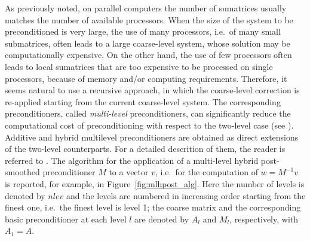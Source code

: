 As previously noted, on parallel computers the number of sumatrices usually matches
the number of available processors. When the size of the system to be preconditioned
is very large, the use of many processors, i.e.\ of many small submatrices, often
leads to a large coarse-level system, whose solution may be computationally expensive.
On the other hand, the use of few processors often leads to local sumatrices that
are too expensive to be processed on single processors, because of memory and/or
computing requirements. Therefore, it seems natural to use a recursive approach,
in which the coarse-level correction is re-applied starting from the current
coarse-level system. The corresponding preconditioners, called \emph{multi-level}
preconditioners, can significantly reduce the computational cost of preconditioning
with respect to the two-level case (see \cite[Chapter 3]{dd2_96}). 
Additive and hybrid multilevel preconditioners
are obtained as direct extensions of the two-level counterparts.
For a detailed descrition of them, the reader is
referred to \cite[Chapter 3]{dd2_96}.
The algorithm for the application of a multi-level hybrid 
post-smoothed preconditioner $M$ to a vector $v$, i.e.\ for the
computation of $w=M^{-1}v$ is reported, for
example, in Figure~\ref{fig:mlhpost_alg}. Here the number of levels
is denoted by $nlev$ and the levels are numbered in increasing order starting
from the finest one, i.e.\ the finest level is level 1; the coarse matrix
and the corresponding basic preconditioner at each level $l$ are denoted by $A_l$ and
$M_l$, respectively, with $A_1=A$.
% 
